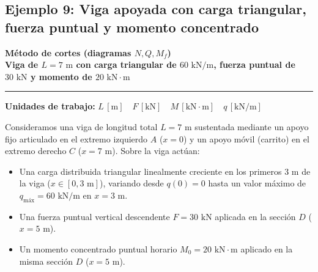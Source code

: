 \subsection{Ejemplo 9: Viga apoyada con carga triangular, fuerza puntual y momento concentrado}

\begin{tcolorbox}[colback=blue!3!white, colframe=blue!40!black, arc=3pt, boxrule=0.8pt, left=8pt, right=8pt, top=6pt, bottom=6pt]
    \centering
    {\Large\bfseries\color{blue!60!black} Método de cortes (diagramas $N, Q, M_f$)}\\[2pt]
    {\normalsize\bfseries Viga de $L = 7\text{ m}$ con carga triangular de $60\text{ kN/m}$, fuerza puntual de $30\text{ kN}$ y momento de $20\text{ kN}\cdot\text{m}$}

    \vspace{4pt}\hrule\vspace{4pt}
    {\small\textbf{Unidades de trabajo:} $L\,[\text{m}] \quad F\,[\text{kN}] \quad M\,[\text{kN}\cdot\text{m}] \quad q\,[\text{kN/m}]$}
\end{tcolorbox}




Consideramos una viga de longitud total $L = 7\text{ m}$ sustentada mediante un apoyo fijo articulado en el extremo izquierdo $A$ ($x = 0$) y un apoyo móvil (carrito) en el extremo derecho $C$ ($x = 7\text{ m}$). Sobre la viga actúan:
\begin{itemize}
    \item Una carga distribuida triangular linealmente creciente en los primeros $3\text{ m}$ de la viga ($x \in [0, 3\text{ m}]$), variando desde $q(0) = 0$ hasta un valor máximo de $q_{\text{máx}} = 60\text{ kN/m}$ en $x = 3\text{ m}$.
    \item Una fuerza puntual vertical descendente $F = 30\text{ kN}$ aplicada en la sección $D$ ($x = 5\text{ m}$).
    \item Un momento concentrado puntual horario $M_0 = 20\text{ kN}\cdot\text{m}$ aplicado en la misma sección $D$ ($x = 5\text{ m}$).
\end{itemize}

